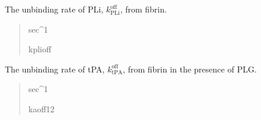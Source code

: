 \documentclass[letterpaper,10pt,english]{sphinxmanual}
\begin{document}
\begin{fulllineitems}
\begin{fulllineitems}
\label{\detokenize{lysis.util:lysis.util.parameters.MicroParameters.unbind_rate_PLi}}
\pysigstartsignatures
{}
\pysigstopsignatures
\sphinxAtStartPar
The unbinding rate of PLi, \(k^\text{off}_\text{PLi}\),
from fibrin.
\begin{quote}\begin{description}
\sphinxAtStartPar
sec\textasciicircum{}\sphinxhyphen{}1

\sphinxAtStartPar
kplioff

\end{description}\end{quote}

\end{fulllineitems}


\begin{fulllineitems}
\label{\detokenize{lysis.util:lysis.util.parameters.MicroParameters.unbind_rate_tPA_wPLG}}
\pysigstartsignatures
{}
\pysigstopsignatures
\sphinxAtStartPar
The unbinding rate of tPA, \(k^\text{off}_\text{tPA}\),
from fibrin in the presence of PLG.
\begin{quote}\begin{description}
\sphinxAtStartPar
sec\textasciicircum{}\sphinxhyphen{}1

\sphinxAtStartPar
kaoff12

\end{description}\end{quote}

\end{fulllineitems}



\end{fulllineitems}
\end{document}
